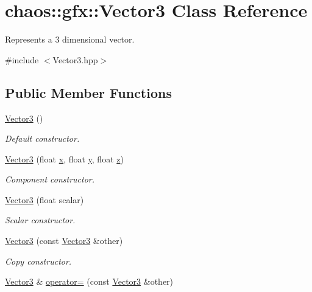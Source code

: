 \hypertarget{classchaos_1_1gfx_1_1_vector3}{\section{chaos\-:\-:gfx\-:\-:Vector3 Class Reference}
\label{classchaos_1_1gfx_1_1_vector3}
}


Represents a 3 dimensional vector.  




{\ttfamily \#include $<$Vector3.\-hpp$>$}

\subsection*{Public Member Functions}
\begin{DoxyCompactItemize}
\item 
\hyperlink{classchaos_1_1gfx_1_1_vector3_a8cd3092f89afc127d6fd993e3291bd2b}{Vector3} ()
\begin{DoxyCompactList}\small\item\em Default constructor. \end{DoxyCompactList}\item 
\hyperlink{classchaos_1_1gfx_1_1_vector3_a62a4131e3f8bfbc1fc076149db944c94}{Vector3} (float \hyperlink{classchaos_1_1gfx_1_1_vector3_ac58f0d4a6e611ae3eec8e9f56476fc13}{x}, float \hyperlink{classchaos_1_1gfx_1_1_vector3_ac001a2e7468d6c6cfc5119d486817f0b}{y}, float \hyperlink{classchaos_1_1gfx_1_1_vector3_a7ec457e7ef3054557dacdc89bf7ce77b}{z})
\begin{DoxyCompactList}\small\item\em Component constructor. \end{DoxyCompactList}\item 
\hyperlink{classchaos_1_1gfx_1_1_vector3_a0ab061f754dac90c843317d979defb70}{Vector3} (float scalar)
\begin{DoxyCompactList}\small\item\em Scalar constructor. \end{DoxyCompactList}\item 
\hyperlink{classchaos_1_1gfx_1_1_vector3_a32fd7944a73e7f8d9bb6a9e6ee6d4bce}{Vector3} (const \hyperlink{classchaos_1_1gfx_1_1_vector3}{Vector3} \&other)
\begin{DoxyCompactList}\small\item\em Copy constructor. \end{DoxyCompactList}\item 
\hyperlink{classchaos_1_1gfx_1_1_vector3}{Vector3} \& \hyperlink{classchaos_1_1gfx_1_1_vector3_a3c26200a523e201ef3697797732951cb}{operator=} (const \hyperlink{classchaos_1_1gfx_1_1_vector3}{Vector3} \&other)

\end{DoxyCompactItemize}
